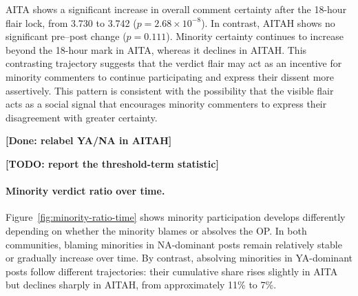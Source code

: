 AITA shows a significant increase in overall comment certainty after the 18-hour flair lock, from 3.730 to 3.742 (\(p=2.68\times10^{-8}\)). In contrast, AITAH shows no significant pre–post change (\(p=0.111\)). Minority certainty continues to increase beyond the 18-hour mark in AITA, whereas it declines in AITAH. This contrasting trajectory suggests that the verdict flair may act as an incentive for minority commenters to continue participating and express their dissent more assertively. This pattern is consistent with the possibility that the visible flair acts as a social signal that encourages minority commenters to express their disagreement with greater certainty.

\textbf{[Done: relabel YA/NA in AITAH]}

\textbf{[TODO: report the threshold-term statistic]}


\paragraph{Minority verdict ratio over time.}
Figure~\ref{fig:minority-ratio-time} shows minority participation develops differently depending on whether the minority blames or absolves the OP. In both communities, blaming minorities in NA-dominant posts remain relatively stable or gradually increase over time. By contrast, absolving minorities in YA-dominant posts follow different trajectories: their cumulative share rises slightly in AITA but declines sharply in AITAH, from approximately 11\% to 7\%.



